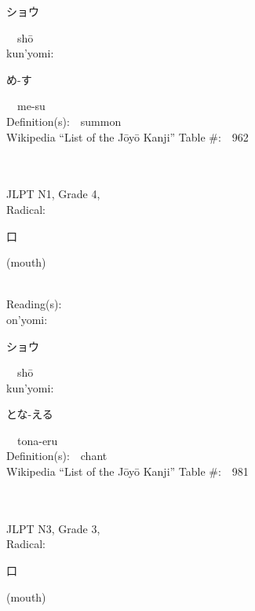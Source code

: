 \begin{multicols}{2}
{\hspace*{2em}}{\begin{CJK}{UTF8}{min} ショウ \end{CJK}}\ \ sh\=o\ \ \\
{\hspace*{1em}}kun'yomi:\ \ \\
{\hspace*{2em}}{\begin{CJK}{UTF8}{min} め-す \end{CJK}}\ \ me-su\ \ \\
Definition(s):\ \ summon \\
Wikipedia ``List of the J\=oy\=o Kanji'' Table \#:\ \ 962 \\
\ \ \\
{\fontsize{34pt}{40pt}  }\ \ \\  %
{JLPT N1, Grade 4, \\Radical:\ \ {\begin{CJK}{UTF8}{min} 口 \end{CJK}} (mouth) } \\
Reading(s):\ \ \\
{\hspace*{1em}}on'yomi:\ \ \\
{\hspace*{2em}}{\begin{CJK}{UTF8}{min} ショウ \end{CJK}}\ \ sh\=o\ \ \\
{\hspace*{1em}}kun'yomi:\ \ \\
{\hspace*{2em}}{\begin{CJK}{UTF8}{min} とな-える \end{CJK}}\ \ tona-eru\ \ \\
Definition(s):\ \ chant \\
Wikipedia ``List of the J\=oy\=o Kanji'' Table \#:\ \ 981 \\
\ \ \\
{\fontsize{34pt}{40pt}  }\ \ \\  %
{JLPT N3, Grade 3, \\Radical:\ \ {\begin{CJK}{UTF8}{min} 口 \end{CJK}} (mouth) } \\

\end{multicols}
